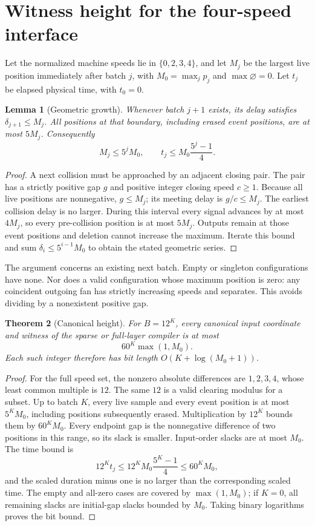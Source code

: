 \documentclass[11pt,letterpaper]{article}
\numberwithin{equation}{section}
\newtheorem{theorem}{Theorem}[section]
\newtheorem{lemma}[theorem]{Lemma}
\theoremstyle{definition}
\theoremstyle{remark}
\begin{document}
\section{Witness height for the four-speed interface}\label{smc:sd:sec:height}
Let the normalized machine speeds lie in $\{0,2,3,4\}$, and let $M_j$ be the largest live position immediately after batch $j$, with $M_0=\max_j p_j$ and $\max\varnothing=0$. Let $t_j$ be elapsed physical time, with $t_0=0$.

\begin{lemma}[Geometric growth]\label{smc:sd:lem:growth}
Whenever batch $j+1$ exists, its delay satisfies $\delta_{j+1}\le M_j$. All positions at that boundary, including erased event positions, are at most $5M_j$. Consequently
\[
 M_j\le5^jM_0,\qquad
 t_j\le M_0\frac{5^j-1}{4}.
\]
\end{lemma}
\begin{proof}
A next collision must be approached by an adjacent closing pair. The pair has a strictly positive gap $g$ and positive integer closing speed $c\ge1$. Because all live positions are nonnegative, $g\le M_j$; its meeting delay is $g/c\le M_j$. The earliest collision delay is no larger. During this interval every signal advances by at most $4M_j$, so every pre-collision position is at most $5M_j$. Outputs remain at those event positions and deletion cannot increase the maximum. Iterate this bound and sum $\delta_i\le5^{i-1}M_0$ to obtain the stated geometric series.
\end{proof}

The argument concerns an existing next batch. Empty or singleton configurations have none. Nor does a valid configuration whose maximum position is zero: any coincident outgoing fan has strictly increasing speeds and separates. This avoids dividing by a nonexistent positive gap.

\begin{theorem}[Canonical height]\label{smc:sd:thm:height}
For $B=12^K$, every canonical input coordinate and witness of the sparse or full-layer compiler is at most
\begin{equation}\label{smc:sd:eq:height}
 60^K\max(1,M_0).
\end{equation}
Each such integer therefore has bit length $O(K+\log(M_0+1))$.
\end{theorem}
\begin{proof}
For the full speed set, the nonzero absolute differences are $1,2,3,4$, whose least common multiple is $12$. The same $12$ is a valid clearing modulus for a subset. Up to batch $K$, every live sample and every event position is at most $5^KM_0$, including positions subsequently erased. Multiplication by $12^K$ bounds them by $60^KM_0$. Every endpoint gap is the nonnegative difference of two positions in this range, so its slack is smaller. Input-order slacks are at most $M_0$. The time bound is
\[
 12^Kt_j\le12^KM_0\frac{5^K-1}{4}\le60^KM_0,
\]
and the scaled duration minus one is no larger than the corresponding scaled time. The empty and all-zero cases are covered by $\max(1,M_0)$; if $K=0$, all remaining slacks are initial-gap slacks bounded by $M_0$. Taking binary logarithms proves the bit bound.
\end{proof}
\end{document}
